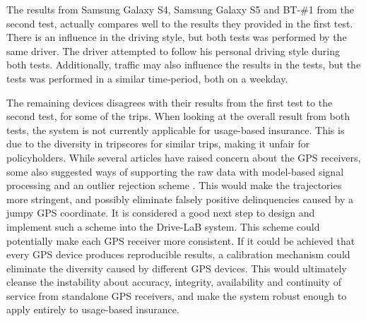 The results from Samsung Galaxy S4, Samsung Galaxy S5 and BT-\#1 from the second test, actually compares well to the results they provided in the first test. There is an influence in the driving style, but both tests was performed by the same driver. The driver attempted to follow his personal driving style during both tests. Additionally, traffic may also influence the results in the tests, but the tests was performed in a similar time-period, both on a weekday. 

The remaining devices disagrees with their results from the first test to the second test, for some of the trips. When looking at the overall result from both tests, the system is not currently applicable for usage-based insurance. This is due to the diversity in tripscores for similar trips, making it unfair for policyholders. While several articles have raised concern about the GPS receivers, some also suggested ways of supporting the raw data with model-based signal processing and an outlier rejection scheme \citep{art:smartphones_for_monitoring_and_ubi} \citep{art:insurtelematics} \citep{art:challenges_smartphone_ubi}. This would make the trajectories more stringent, and possibly eliminate falsely positive delinquencies caused by a jumpy GPS coordinate. It is considered a good next step to design and implement such a scheme into the Drive-LaB system. This scheme could potentially make each GPS receiver more consistent. If it could be achieved that every GPS device produces reproducible results, a calibration mechanism could eliminate the diversity caused by different GPS devices. This would ultimately cleanse the instability about accuracy, integrity, availability and continuity of service from standalone GPS receivers, and make the system robust enough to apply entirely to usage-based insurance.



